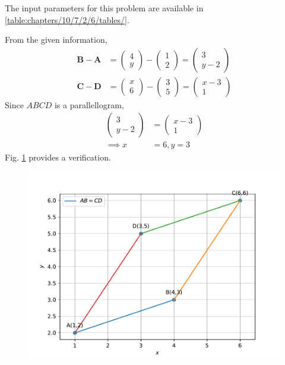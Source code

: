 \documentclass[12pt]{article}
\newcommand{\myvec}[1]{\ensuremath{\begin{pmatrix}#1\end{pmatrix}}}
\let\vec\mathbf
\begin{document}
The input parameters for this problem are available in
\ref{table:chapters/10/7/2/6/tables/}.	
\begin{table}[!ht]
	\centering
	
\caption{}
\label{table:chapters/10/7/2/6/tables/}	
\end{table}
From the given information,
\begin{align}
  \label{eq:chapters/10/7/2/6/tables/det2f}
	\vec{B}-\vec{A} &= \myvec{4 \\y } - \myvec{1 \\2 }  = \myvec{3 \\y-2 }\\
	\vec{C}-\vec{D} &= \myvec{x \\6 } - \myvec{3 \\5 }  = \myvec{x-3 \\1}
\end{align}
Since $ABCD$ is a parallellogram,
\begin{align}
	\myvec{3\\y-2}&=\myvec{x-3\\1}\\
	\implies x&=6 ,y=3
\end{align}
Fig. \ref{fig:chapters/10/7/2/6/Fig3}
provides a verification.
\begin{figure}[h!]
	\begin{center}
  \includegraphics[width=\columnwidth]{chapters/10/7/2/6/figs/para.pdf}
	\end{center}
\caption{}
\label{fig:chapters/10/7/2/6/Fig3}
\end{figure}
\end{document}

